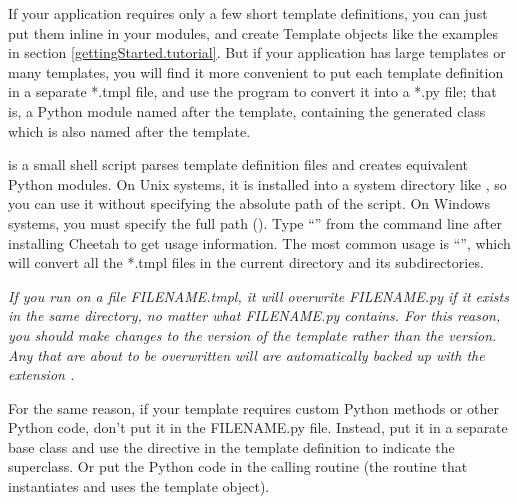 If your application requires only a few short template definitions, you can
just put them inline in your modules, and create Template objects like the
examples in section \ref{gettingStarted.tutorial}.  But if your application
has large templates or many templates, you will find it more convenient to
put each template definition in a separate *.tmpl file, and use the
 program to convert it into a *.py file; that is, a
Python module named after the template, containing the generated class
which is also named after the template.  

 is a small shell script parses template definition
files and creates equivalent Python modules.  On Unix systems, it is installed
into a system directory like , so you can use it without
specifying the absolute path of the script.  On Windows systems, you must
specify the full path (). Type
``'' from the command line after installing Cheetah to
get usage information.  The most common usage is ``'',
which will convert all the *.tmpl files in the current directory
and its subdirectories.

\em{ If you run  on a file FILENAME.tmpl, it will
overwrite FILENAME.py if it exists in the same directory, no matter what
FILENAME.py contains.} For this reason, you should make changes to the
 version of the template rather than the  version.  Any
 that are about to be overwritten will are
automatically backed up with the extension .

For the same reason, if your template requires custom Python methods or
other Python code, don't put it in the FILENAME.py file.  Instead, put
it in a separate base class and use the  directive in the
template definition to indicate the superclass.  Or put the Python code
in the calling routine (the routine that instantiates and uses the template
object).



